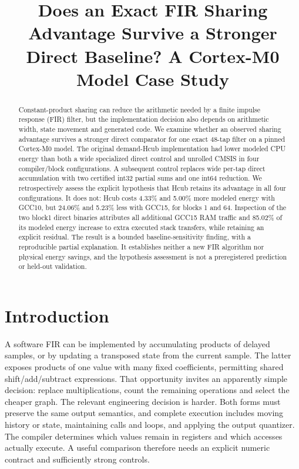 \documentclass[conference]{IEEEtran}
\title{Does an Exact FIR Sharing Advantage Survive a Stronger Direct Baseline? A Cortex-M0 Model Case Study}
\author{\IEEEauthorblockN{Anonymous authors}}
\begin{document}
\pagestyle{plain}
\maketitle
\thispagestyle{plain}
\begin{abstract}

Constant-product sharing can reduce the arithmetic needed by a finite
impulse response (FIR) filter, but the implementation decision also
depends on arithmetic width, state movement and generated code. We
examine whether an observed sharing advantage survives a stronger direct
comparator for one exact 48-tap filter on a pinned Cortex-M0 model. The
original demand-Hcub implementation had lower modeled CPU energy than
both a wide specialized direct control and unrolled CMSIS in four
compiler/block configurations. A subsequent control replaces wide
per-tap direct accumulation with two certified int32 partial sums and
one int64 reduction. We retrospectively assess the explicit hypothesis
that Hcub retains its advantage in all four configurations. It does not:
Hcub costs 4.33\% and 5.00\% more modeled energy with GCC10, but 24.06\%
and 5.23\% less with GCC15, for blocks 1 and 64. Inspection of the two
block1 direct binaries attributes all additional GCC15 RAM traffic and
85.02\% of its modeled energy increase to extra executed stack
transfers, while retaining an explicit residual. The result is a bounded
baseline-sensitivity finding, with a reproducible partial explanation.
It establishes neither a new FIR algorithm nor physical energy savings,
and the hypothesis assessment is not a preregistered prediction or
held-out validation.

\end{abstract}

\section{Introduction}\label{introduction}

A software FIR can be implemented by accumulating products of delayed
samples, or by updating a transposed state from the current sample. The
latter exposes products of one value with many fixed coefficients,
permitting shared shift/add/subtract expressions. That opportunity
invites an apparently simple decision: replace multiplications, count
the remaining operations and select the cheaper graph. The relevant
engineering decision is harder. Both forms must preserve the same output
semantics, and complete execution includes moving history or state,
maintaining calls and loops, and applying the output quantizer. The
compiler determines which values remain in registers and which accesses
actually execute. A useful comparison therefore needs an explicit
numeric contract and sufficiently strong controls.
\end{document}
